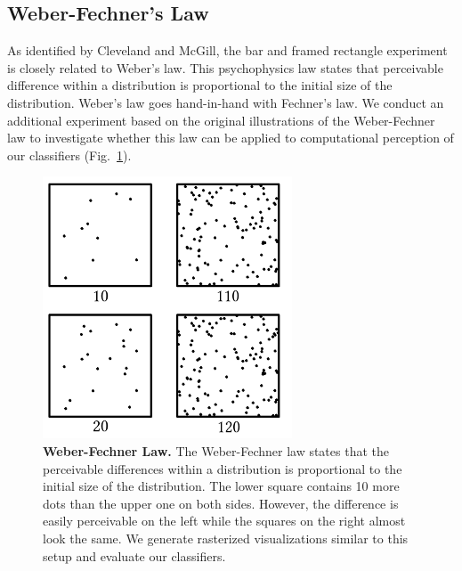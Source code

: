 \documentclass[journal]{vgtc}                %
\begin{document}
\subsection{Weber-Fechner's Law}

As identified by Cleveland and McGill, the bar and framed rectangle experiment is closely related to Weber's law. This psychophysics law states that perceivable difference within a distribution is proportional to the initial size of the distribution. Weber's law goes hand-in-hand with Fechner's law. We conduct an additional experiment based on the original illustrations of the Weber-Fechner law to investigate whether this law can be applied to computational perception of our classifiers (Fig.~\ref{fig:webers_law}).

\begin{figure}[t]
	  \includegraphics[width=\linewidth]{webers_law}
  \caption{\textbf{Weber-Fechner Law.} The Weber-Fechner law states that the perceivable differences within a distribution is proportional to the initial size of the distribution. The lower square contains 10 more dots than the upper one on both sides. However, the difference is easily perceivable on the left while the squares on the right almost look the same. We generate rasterized visualizations similar to this setup and evaluate our classifiers.}
	\label{fig:webers_law}
\end{figure}
\end{document}

